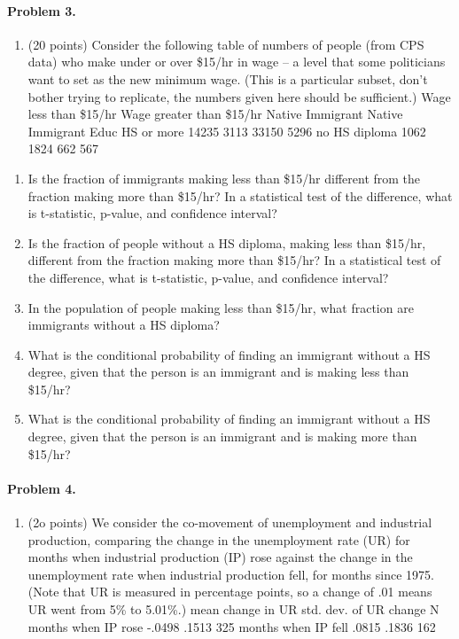 \documentclass[]{article}
\providecommand{\tightlist}{%
  \setlength{\itemsep}{0pt}\setlength{\parskip}{0pt}}
\let\oldparagraph\paragraph
\renewcommand{\paragraph}[1]{\oldparagraph{#1}\mbox{}}
\begin{document}
\paragraph{Problem 3.}\label{problem-3.}

\begin{enumerate}
\def\labelenumi{\arabic{enumi}.}
\setcounter{enumi}{8}
\tightlist
\item
  (20 points) Consider the following table of numbers of people (from
  CPS data) who make under or over \$15/hr in wage -- a level that some
  politicians want to set as the new minimum wage. (This is a particular
  subset, don't bother trying to replicate, the numbers given here
  should be sufficient.) Wage less than \$15/hr Wage greater than
  \$15/hr Native Immigrant Native Immigrant Educ HS or more 14235 3113
  33150 5296 no HS diploma 1062 1824 662 567
\end{enumerate}

\begin{enumerate}
\def\labelenumi{\alph{enumi}.}
\tightlist
\item
  Is the fraction of immigrants making less than \$15/hr different from
  the fraction making more than \$15/hr? In a statistical test of the
  difference, what is t-statistic, p-value, and confidence interval?
\item
  Is the fraction of people without a HS diploma, making less than
  \$15/hr, different from the fraction making more than \$15/hr? In a
  statistical test of the difference, what is t-statistic, p-value, and
  confidence interval?
\item
  In the population of people making less than \$15/hr, what fraction
  are immigrants without a HS diploma?
\item
  What is the conditional probability of finding an immigrant without a
  HS degree, given that the person is an immigrant and is making less
  than \$15/hr?
\item
  What is the conditional probability of finding an immigrant without a
  HS degree, given that the person is an immigrant and is making more
  than \$15/hr?
\end{enumerate}

\paragraph{Problem 4.}\label{problem-4.}

\begin{enumerate}
\def\labelenumi{\arabic{enumi}.}
\setcounter{enumi}{9}
\tightlist
\item
  (2o points) We consider the co-movement of unemployment and industrial
  production, comparing the change in the unemployment rate (UR) for
  months when industrial production (IP) rose against the change in the
  unemployment rate when industrial production fell, for months since
  1975. (Note that UR is measured in percentage points, so a change of
  .01 means UR went from 5\% to 5.01\%.) mean change in UR std. dev. of
  UR change N months when IP rose -.0498 .1513 325 months when IP fell
  .0815 .1836 162
\end{enumerate}
\end{document}
